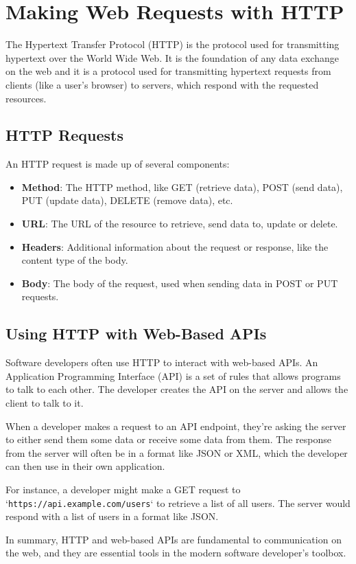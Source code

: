 \chapter{Making Web Requests with HTTP}

The Hypertext Transfer Protocol (HTTP) is the protocol used for transmitting hypertext over the World Wide Web. It is the foundation of any data exchange on the web and it is a protocol used for transmitting hypertext requests from clients (like a user's browser) to servers, which respond with the requested resources.

\section{HTTP Requests}

An HTTP request is made up of several components:

\begin{itemize}
    \item \textbf{Method}: The HTTP method, like GET (retrieve data), POST (send data), PUT (update data), DELETE (remove data), etc.
    \item \textbf{URL}: The URL of the resource to retrieve, send data to, update or delete.
    \item \textbf{Headers}: Additional information about the request or response, like the content type of the body.
    \item \textbf{Body}: The body of the request, used when sending data in POST or PUT requests.
\end{itemize}

\section{Using HTTP with Web-Based APIs}

Software developers often use HTTP to interact with web-based APIs. An Application Programming Interface (API) is a set of rules that allows programs to talk to each other. The developer creates the API on the server and allows the client to talk to it.

When a developer makes a request to an API endpoint, they're asking the server to either send them some data or receive some data from them. The response from the server will often be in a format like JSON or XML, which the developer can then use in their own application.

For instance, a developer might make a GET request to `\texttt{https://api.example.com/users}` to retrieve a list of all users. The server would respond with a list of users in a format like JSON.

In summary, HTTP and web-based APIs are fundamental to communication on the web, and they are essential tools in the modern software developer's toolbox.
